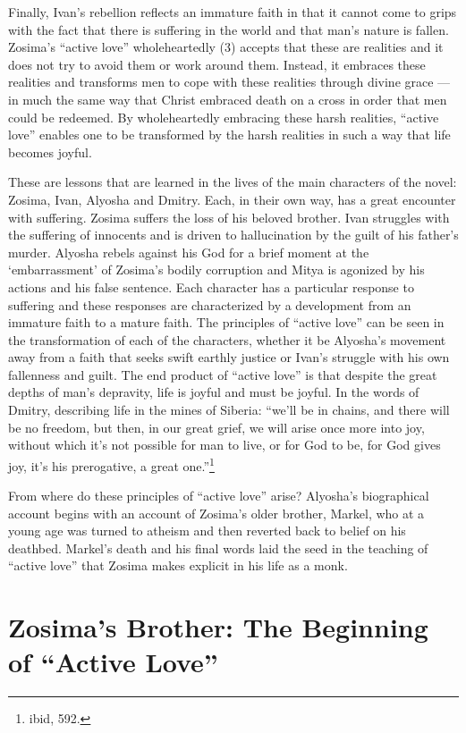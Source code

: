Finally, Ivan's rebellion reflects an immature faith in that it cannot come to grips with the fact that there is suffering in the world and that man's nature is fallen. Zosima's ``active love'' wholeheartedly (3) accepts that these are realities and it does not try to avoid them or work around them. Instead, it embraces these realities and transforms men to cope with these realities through divine grace --- in much the same way that Christ embraced death on a cross in order that men could be redeemed. By wholeheartedly embracing these harsh realities, ``active love'' enables one to be transformed by the harsh realities in such a way that life becomes joyful.

These are lessons that are learned in the lives of the main characters of the novel: Zosima, Ivan, Alyosha and Dmitry. Each, in their own way, has a great encounter with suffering. Zosima suffers the loss of his beloved brother. Ivan struggles with the suffering of innocents and is driven to hallucination by the guilt of his father's murder. Alyosha rebels against his God for a brief moment at the `embarrassment' of Zosima's bodily corruption and Mitya is agonized by his actions and his false sentence. Each character has a particular response to suffering and these responses are characterized by a development from an immature faith to a mature faith. The principles of ``active love'' can be seen in the transformation of each of the characters, whether it be Alyosha's movement away from a faith that seeks swift earthly justice or Ivan's struggle with his own fallenness and guilt. The end product of ``active love'' is that despite the great depths of man's depravity, life is joyful and must be joyful. In the words of Dmitry, describing life in the mines of Siberia: ``we'll be in chains, and there will be no freedom, but then, in our great grief, we will arise once more into joy, without which it's not possible for man to live, or for God to be, for God gives joy, it's his prerogative, a great one.''\footnote{ibid, 592.}

From where do these principles of ``active love'' arise? Alyosha's biographical account begins with an account of Zosima's older brother, Markel, who at a young age was turned to atheism and then reverted back to belief on his deathbed. Markel's death and his final words laid the seed in the teaching of ``active love'' that Zosima makes explicit in his life as a monk.

        \section{Zosima's Brother: The Beginning of ``Active Love''}
        
